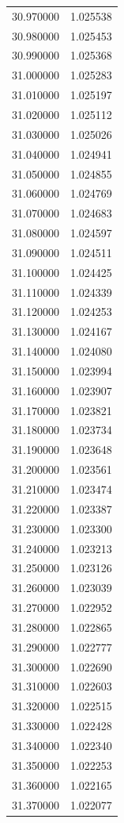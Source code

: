 \begin{tabular}{rr}
30.970000 & 1.025538 \\
30.980000 & 1.025453 \\
30.990000 & 1.025368 \\
31.000000 & 1.025283 \\
31.010000 & 1.025197 \\
31.020000 & 1.025112 \\
31.030000 & 1.025026 \\
31.040000 & 1.024941 \\
31.050000 & 1.024855 \\
31.060000 & 1.024769 \\
31.070000 & 1.024683 \\
31.080000 & 1.024597 \\
31.090000 & 1.024511 \\
31.100000 & 1.024425 \\
31.110000 & 1.024339 \\
31.120000 & 1.024253 \\
31.130000 & 1.024167 \\
31.140000 & 1.024080 \\
31.150000 & 1.023994 \\
31.160000 & 1.023907 \\
31.170000 & 1.023821 \\
31.180000 & 1.023734 \\
31.190000 & 1.023648 \\
31.200000 & 1.023561 \\
31.210000 & 1.023474 \\
31.220000 & 1.023387 \\
31.230000 & 1.023300 \\
31.240000 & 1.023213 \\
31.250000 & 1.023126 \\
31.260000 & 1.023039 \\
31.270000 & 1.022952 \\
31.280000 & 1.022865 \\
31.290000 & 1.022777 \\
31.300000 & 1.022690 \\
31.310000 & 1.022603 \\
31.320000 & 1.022515 \\
31.330000 & 1.022428 \\
31.340000 & 1.022340 \\
31.350000 & 1.022253 \\
31.360000 & 1.022165 \\
31.370000 & 1.022077 \\

\end{tabular}
